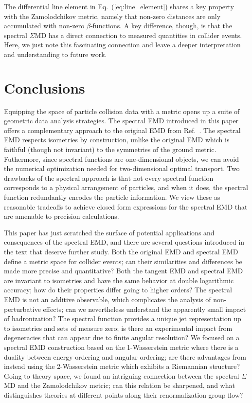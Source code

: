 \documentclass[letterpaper,11pt]{article}
\DeclareRobustCommand{\Eq}[1]{Eq.~(\ref{#1})}
\DeclareRobustCommand{\InRef}[1]{Ref.~\cite{#1}}
\begin{document}
The differential line element in \Eq{eq:line_element} shares a key property with the Zamolodchikov metric, namely that non-zero distances are only accumulated with non-zero $\beta$-functions.
%
A key difference, though, is that the spectral $\Sigma$MD has a direct connection to measured quantities in collider events.
%
Here, we just note this fascinating connection and leave a deeper interpretation and understanding to future work.



\section{Conclusions}
\label{sec:concs}

Equipping the space of particle collision data with a metric opens up a suite of geometric data analysis strategies.
%
The spectral EMD introduced in this paper offers a complementary approach to the original EMD from \InRef{Komiske:2019fks}.
%
The spectral EMD respects isometries by construction, unlike the original EMD which is faithful (though not invariant) to the symmetries of the ground metric.
%
Futhermore, since spectral functions are one-dimensional objects, we can avoid the numerical optimization needed for two-dimensional optimal transport.
%
Two drawbacks of the spectral approach is that not every spectral function corresponds to a physical arrangement of particles, and when it does, the spectral function redundantly encodes the particle information.
%
We view these as reasonable tradeoffs to achieve closed form expressions for the spectral EMD that are amenable to  precision calculations.


This paper has just scratched the surface of potential applications and consequences of the spectral EMD, and there are several questions introduced in the text that deserve further study.
%
Both the original EMD and spectral EMD define a metric space for collider events; can their similarities and differences be made more precise and quantitative?
%
Both the tangent EMD and spectral EMD are invariant to isometries and have the same behavior at double logarithmic accuracy; how do their properties differ going to higher orders?
%
The spectral EMD is not an additive observable, which complicates the analysis of non-perturbative effects; can we nevertheless understand the apparently small impact of hadronization?
%
The spectral function provides a unique jet representation up to isometries and sets of measure zero; is there an experimental impact from degeneracies that can appear due to finite angular resolution?
%
We focused on a spectral EMD construction based on the 1-Wasserstein metric where there is a duality between energy ordering and angular ordering; are there advantages from instead using the 2-Wasserstein metric which exhibits a Riemannian structure?
%
Going to theory space, we found an intriguing connection between the spectral $\Sigma$MD and the Zamolodchikov metric; can this relation be sharpened, and what distinguishes theories at different points along their renormalization group flow?
\end{document}
